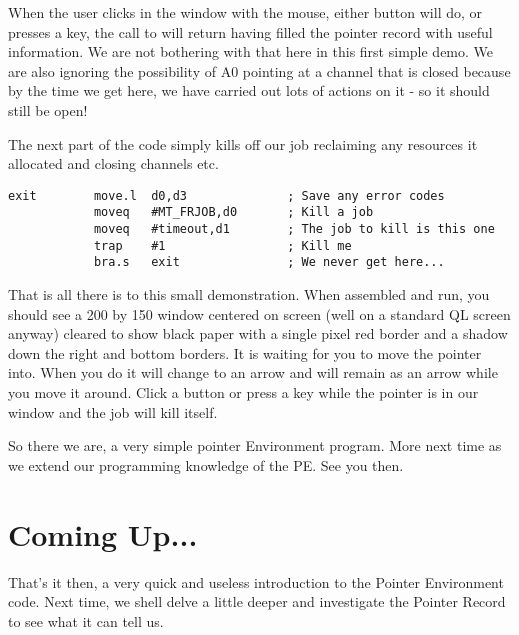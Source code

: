 When the user clicks in the window with the mouse, either button will do, or presses
a key, the call to  will return having filled the pointer record with useful
information. We are not bothering with that here in this first simple demo. We are also
ignoring the possibility of A0 pointing at a channel that is closed because by the time we
get here, we have carried out lots of actions on it -{} so it should still be open!

The next part of the code simply kills off our job reclaiming any resources it
allocated and closing channels etc.

\begin{lstlisting}[firstnumber=last,caption={Simple PE Program - Part 10}]
exit        move.l  d0,d3              ; Save any error codes
            moveq   #MT_FRJOB,d0       ; Kill a job
            moveq   #timeout,d1        ; The job to kill is this one
            trap    #1                 ; Kill me
            bra.s   exit               ; We never get here...
\end{lstlisting}

That is all there is to this small demonstration. When assembled and run, you should
see a 200 by 150 window centered on screen (well on a standard QL screen anyway) cleared
to show black paper with a single pixel red border and a shadow down the right and bottom
borders. It is waiting for you to move the pointer into. When you do it will change to an
arrow and will remain as an arrow while you move it around. Click a button or press a key
while the pointer is in our window and the job will kill itself.

So there we are, a very simple pointer Environment program. More next time as we
extend our programming knowledge of the PE. See you then.

\section{Coming Up...}
\label{ch20-the-end}%

That's it then, a very quick and useless introduction to the Pointer Environment
code. Next time, we shell delve a little deeper and investigate the Pointer Record to see
what it can tell us.
